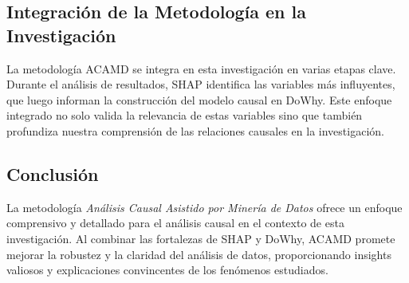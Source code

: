 
\subsection{Integración de la Metodología en la Investigación}\label{subsec:integracion-metodologia}

La metodología ACAMD se integra en esta investigación en varias etapas clave. Durante el análisis de resultados, SHAP identifica las variables más influyentes, que luego informan la construcción del modelo causal en DoWhy. Este enfoque integrado no solo valida la relevancia de estas variables sino que también profundiza nuestra comprensión de las relaciones causales en la investigación.

\subsection{Conclusión}\label{subsec:conclusion-metodologia}

La metodología \textit{Análisis Causal Asistido por Minería de Datos} ofrece un enfoque comprensivo y detallado para el análisis causal en el contexto de esta investigación. Al combinar las fortalezas de SHAP y DoWhy, ACAMD promete mejorar la robustez y la claridad del análisis de datos, proporcionando insights valiosos y explicaciones convincentes de los fenómenos estudiados.
